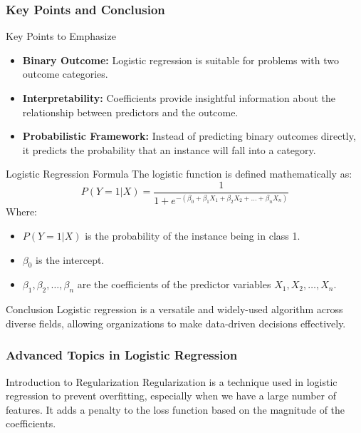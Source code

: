 \documentclass[aspectratio=169]{beamer}
\begin{document}
\begin{frame}[fragile]
    \frametitle{Key Points and Conclusion}
    \begin{block}{Key Points to Emphasize}
        \begin{itemize}
            \item \textbf{Binary Outcome:} Logistic regression is suitable for problems with two outcome categories.
            \item \textbf{Interpretability:} Coefficients provide insightful information about the relationship between predictors and the outcome.
            \item \textbf{Probabilistic Framework:} Instead of predicting binary outcomes directly, it predicts the probability that an instance will fall into a category.
        \end{itemize}
    \end{block}
    
    \begin{block}{Logistic Regression Formula}
        The logistic function is defined mathematically as:
        \begin{equation}
            P(Y=1 | X) = \frac{1}{1 + e^{-(\beta_0 + \beta_1 X_1 + \beta_2 X_2 + \ldots + \beta_n X_n)}}
        \end{equation}
        Where:
        \begin{itemize}
            \item $P(Y=1 | X)$ is the probability of the instance being in class 1.
            \item $\beta_0$ is the intercept.
            \item $\beta_1, \beta_2, \ldots, \beta_n$ are the coefficients of the predictor variables $X_1, X_2, \ldots, X_n$.
        \end{itemize}
    \end{block}
    
    \begin{block}{Conclusion}
        Logistic regression is a versatile and widely-used algorithm across diverse fields, allowing organizations to make data-driven decisions effectively.
    \end{block}
\end{frame}

\begin{frame}[fragile]
    \frametitle{Advanced Topics in Logistic Regression}
    \begin{block}{Introduction to Regularization}
        Regularization is a technique used in logistic regression to prevent overfitting, especially when we have a large number of features. It adds a penalty to the loss function based on the magnitude of the coefficients.
    \end{block}
\end{frame}
\end{document}
